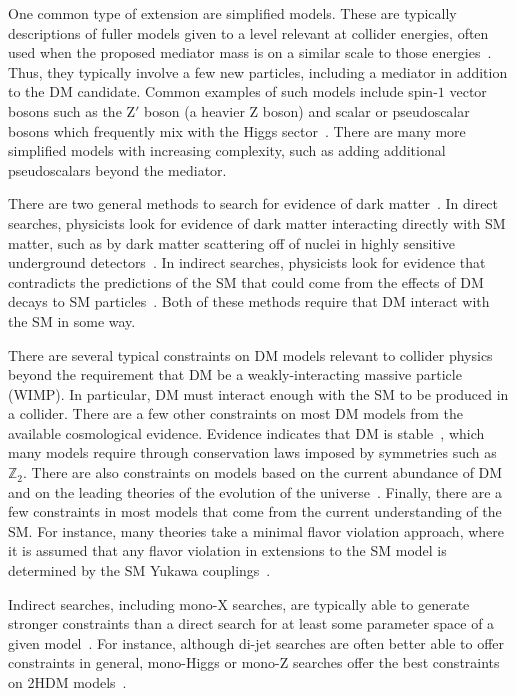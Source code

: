 One common type of extension are simplified models. These are typically descriptions of fuller models given to a level relevant at collider energies, often used when the proposed mediator mass is on a similar scale to those energies~\cite{dms2018}. Thus, they typically involve a few new particles, including a mediator in addition to the DM candidate. Common examples of such models include spin-$1$ vector bosons such as the Z$'$ boson (a heavier Z boson) and scalar or pseudoscalar bosons which frequently mix with the Higgs sector~\cite{thdma2017,barZ2014}. There are many more simplified models with increasing complexity, such as adding additional pseudoscalars beyond the mediator.

There are two general methods to search for evidence of dark matter~\cite{dms2018}. In direct searches, physicists look for evidence of dark matter interacting directly with SM matter, such as by dark matter scattering off of nuclei in highly sensitive underground detectors~\cite{Schumann_2019}. In indirect searches, physicists look for evidence that contradicts the predictions of the SM that could come from the effects of DM decays to SM particles~\cite{Gaskins_2016}. Both of these methods require that DM interact with the SM in some way. 

There are several typical constraints on DM models relevant to collider physics beyond the requirement that DM be a weakly-interacting massive particle (WIMP). In particular, DM must interact enough with the SM to be produced in a collider. There are a few other constraints on most DM models from the available cosmological evidence. Evidence indicates that DM is stable~\cite{Cohen_2017}, which many models require through conservation laws imposed by symmetries such as $\mathbb{Z}_2$. There are also constraints on models based on the current abundance of DM~\cite{Planck:2020cp} and on the leading theories of the evolution of the universe~\cite{Steigman_2012}. Finally, there are a few constraints in most models that come from the current understanding of the SM. For instance, many theories take a minimal flavor violation approach, where it is assumed that any flavor violation in extensions to the SM model is determined by the SM Yukawa couplings~\cite{D_Ambrosio_2002}.

Indirect searches, including mono-X searches, are typically able to generate stronger constraints than a direct search for at least some parameter space of a given model~\cite{xvdir2017}. For instance, although di-jet searches are often better able to offer constraints in general, mono-Higgs or mono-Z searches offer the best constraints on 2HDM models~\cite{thdma2017}. 

